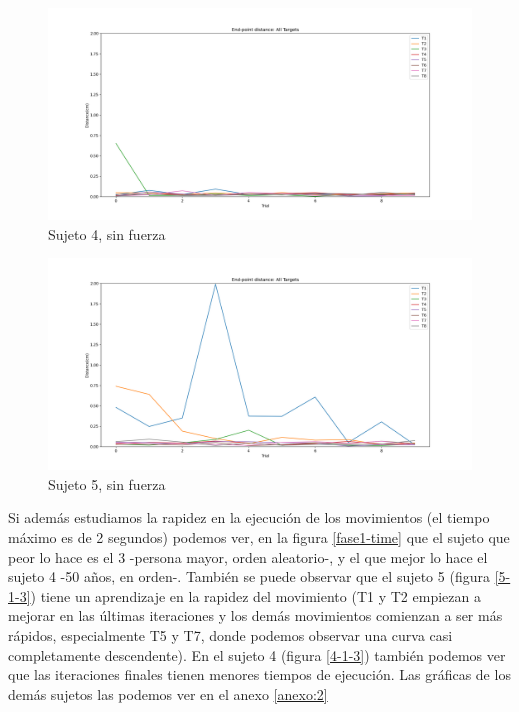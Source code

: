 \documentclass[a4paper,11pt, oneside]{book}
\begin{document}
\begin{figure}[H]
	\centering
	\includegraphics[width=\linewidth]{sujeto4/no_force/evolution_distance}
	\caption{Sujeto 4, sin fuerza}
	\label{4-1-2}
\end{figure}
\begin{figure}[H]
	\centering
	\includegraphics[width=\linewidth]{sujeto5/no_force/evolution_distance}
	\caption{Sujeto 5, sin fuerza}
	\label{5-1-2}
\end{figure}


Si además estudiamos la rapidez en la ejecución de los movimientos (el tiempo máximo es de 2 segundos) podemos ver, en la figura \ref{fase1-time} que el sujeto que peor lo hace es el 3 -persona mayor, orden aleatorio-, y el que mejor lo hace el sujeto 4 -50 años, en orden-. También se puede observar que el sujeto 5 (figura \ref{5-1-3}) tiene un aprendizaje en la rapidez del movimiento (T1 y T2 empiezan a mejorar en las últimas iteraciones y los demás movimientos comienzan a ser más rápidos, especialmente T5 y T7, donde podemos observar una curva casi completamente descendente). En el sujeto 4 (figura \ref{4-1-3}) también podemos ver que las iteraciones finales tienen menores tiempos de ejecución. Las gráficas de los demás sujetos las podemos ver en el anexo \ref{anexo:2}
\end{document}
